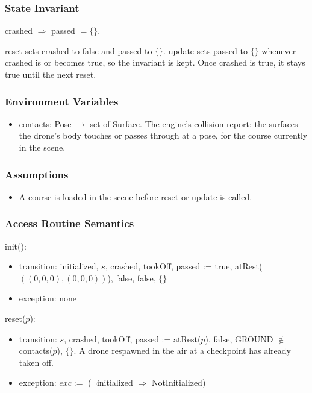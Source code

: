 \documentclass[12pt, titlepage]{article}
\newcommand{\True}{\textnormal{true}}
\newcommand{\False}{\textnormal{false}}
\newcommand{\noinit}{$\neg$initialized $\Rightarrow$ NotInitialized}
\begin{document}
\subsubsection{State Invariant}

crashed $\Rightarrow$ passed $= \{\}$.

reset sets crashed to \False{} and passed to $\{\}$. update sets passed to
$\{\}$ whenever crashed is or becomes \True, so the invariant is kept. Once
crashed is \True, it stays \True{} until the next reset.

\subsubsection{Environment Variables}

\begin{itemize}
\item contacts: Pose $\rightarrow$ set of Surface. The engine's collision
  report: the surfaces the drone's body touches or passes through at a pose,
  for the course currently in the scene.
\end{itemize}

\subsubsection{Assumptions}

\begin{itemize}
\item A course is loaded in the scene before reset or update is called.
\end{itemize}

\subsubsection{Access Routine Semantics}

\noindent init():
\begin{itemize}
\item transition: initialized, $s$, crashed, tookOff, passed := \True,
  atRest($((0,0,0), (0,0,0))$), \False, \False, $\{\}$
\item exception: none
\end{itemize}

\noindent reset($p$):
\begin{itemize}
\item transition: $s$, crashed, tookOff, passed := atRest($p$), \False,
  GROUND $\notin$ contacts($p$), $\{\}$. A drone respawned in the air at a
  checkpoint has already taken off.
\item exception: $exc :=$ (\noinit)
\end{itemize}
\end{document}
